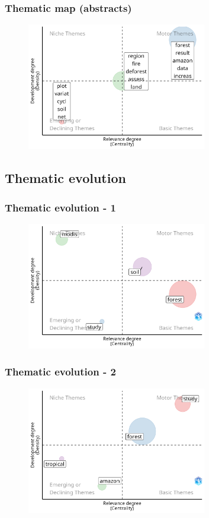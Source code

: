 \documentclass[aspectratio=169]{beamer}
\begin{document}
\begin{frame}
	\frametitle{Thematic map (abstracts)}
	\begin{figure}
		\centering
		\includegraphics[width=0.7\textwidth]
        {figures/thematic_map_abstracts.png}
	\end{figure}
\end{frame}


\subsection{Thematic evolution}

\begin{frame}
	\frametitle{Thematic evolution - 1}
    \begin{figure}
        \centering
        \includegraphics[width=0.7\textwidth]{figures/thematic_evolution_1.png}
    \end{figure}
\end{frame}

\begin{frame}
	\frametitle{Thematic evolution - 2}
    \begin{figure}
        \centering
        \includegraphics[width=0.7\textwidth]{figures/thematic_evolution_2.png}
    \end{figure}
\end{frame}
\end{document}
